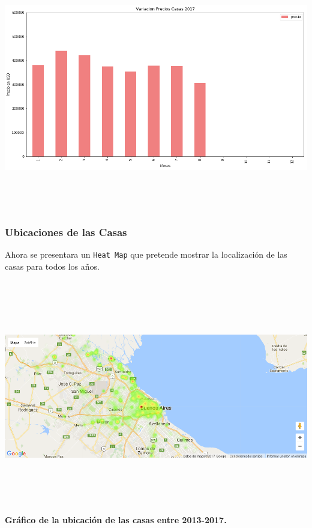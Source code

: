 \documentclass[a4paper, 10pt]{article}
\def\code#1{\texttt{#1}}
\newcommand\tab[1][0.5cm]{\hspace*{#1}}
\begin{document}
        \begin{center}
              \includegraphics[width=6in, height=4.2in]{images/vCasas2017}
        \end{center}

      \subsubsection{Ubicaciones de las Casas}

        \tab Ahora se presentara un \code{Heat Map} que pretende mostrar la localización de las casas para todos los años.

        \begin{center}
              \includegraphics[width=7in, height=4in]{images/ubicCasas}
              \textbf{Gráfico de la ubicación de las casas entre 2013-2017.}
        \end{center}
\end{document}
